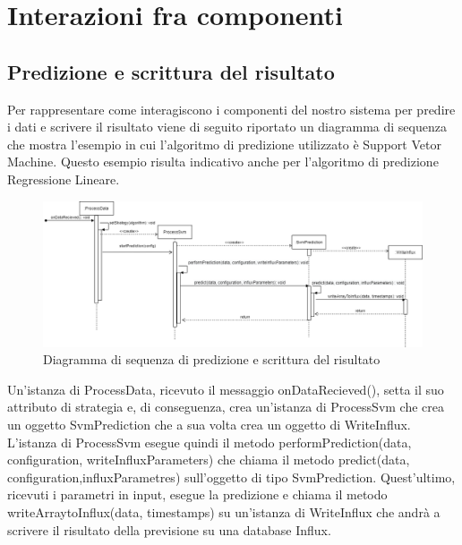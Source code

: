 \section{Interazioni fra componenti}
	\subsection{Predizione e scrittura del risultato}
	Per rappresentare come interagiscono i componenti del nostro sistema per predire i dati e scrivere il risultato viene di seguito riportato un diagramma di sequenza che mostra l'esempio in cui l'algoritmo di predizione utilizzato è Support Vetor Machine. Questo esempio risulta indicativo anche per l'algoritmo di predizione Regressione Lineare.  
	\mbox{}
	\begin{figure} [H]
		\includegraphics[width=\linewidth]{./img/Diagrammi/ds1.png}
		\caption{Diagramma di sequenza di predizione e scrittura del risultato}
	\end{figure}
	Un'istanza di ProcessData, ricevuto il messaggio onDataRecieved(), setta il suo attributo di strategia e, di conseguenza, crea un'istanza di ProcessSvm che crea un oggetto SvmPrediction che a sua volta crea un oggetto di WriteInflux.
	L'istanza di ProcessSvm esegue quindi il metodo performPrediction(data, configuration, writeInfluxParameters) che chiama il metodo predict(data, configuration,influxParametres) sull'oggetto di tipo SvmPrediction. Quest'ultimo, ricevuti i parametri in input, esegue la predizione e chiama il metodo writeArraytoInflux(data, timestamps) su un'istanza di WriteInflux che andrà a scrivere il risultato della previsione su una database Influx.
	
